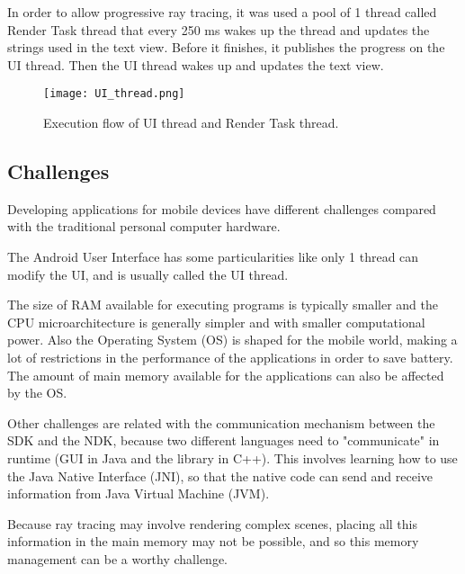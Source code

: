 \par
In order to allow progressive ray tracing, it was used a pool of 1 thread called Render Task thread that every 250 ms wakes up the thread and updates the strings used in the text view.
Before it finishes, it publishes the progress on the UI thread.
Then the UI thread wakes up and updates the text view.

\begin{figure}[H]
	\centering
	\caption{Execution flow of UI thread and Render Task thread.}
	\label{Execution flow of UI thread and Render Task thread}
	\texttt{[image: UI\_thread.png]}
\end{figure}

\subsection{Challenges}

\par
Developing applications for mobile devices have different challenges compared with the traditional personal computer hardware.

\par
The Android User Interface has some particularities like only 1 thread can modify the UI, and is usually called the UI thread.

\par
The size of RAM available for executing programs is typically smaller and the CPU microarchitecture is generally simpler and with smaller computational power.
Also the Operating System (OS) is shaped for the mobile world, making a lot of restrictions in the performance of the applications in order to save battery.
The amount of main memory available for the applications can also be affected by the OS.

\par
Other challenges are related with the communication mechanism between the SDK and the NDK, because two different languages need to "communicate" in runtime (GUI in Java and the library in C++).
This involves learning how to use the Java Native Interface (JNI), so that the native code can send and receive information from Java Virtual Machine (JVM).

\par
Because ray tracing may involve rendering complex scenes, placing all this information in the main memory may not be possible, and so this memory management can be a worthy challenge.